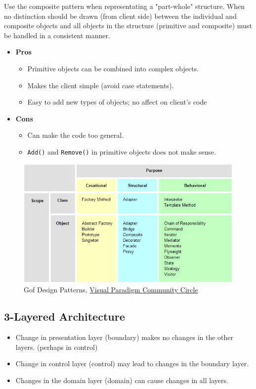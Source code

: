 \noindent Use the composite pattern when representating a "part-whole" structure. When no distinction should be drawn (from client side) between the individual and composite objects and all objects in the structure (primitive and composite) must be handled in a consistent manner.
\newpage\begin{itemize}
	\item \textbf{Pros}
	\begin{itemize}
		\item Primitive objects can be combined into complex objects.
		\item Makes the client simple (avoid case statements).
		\item Easy to add new types of objects; no affect on client's code
	\end{itemize}
	\item \textbf{Cons}
	\begin{itemize}
		\item Can make the code too general.
		\item \texttt{Add()} and \texttt{Remove()} in primitive objects	does not make sense.
	\end{itemize}
\end{itemize}
\begin{figure} [H]
	\centering
	\includegraphics[width=\linewidth]{graphics/23.png}
	\caption{Gof Design Patterns, \href{https://circle.visual-paradigm.com/catalog/}{Visual Paradigm Community Circle}}
	\label{fig:23}
\end{figure}

\newpage \subsection{3-Layered Architecture}

\begin{itemize}
	\item Change in presentation layer (boundary) makes no changes in the
	other layers. (perhaps in control)
	\item Change in control layer (control) may	lead to changes in the boundary layer.
	\item Changes in the domain layer (domain) 	can cause changes in all layers.
\end{itemize}

